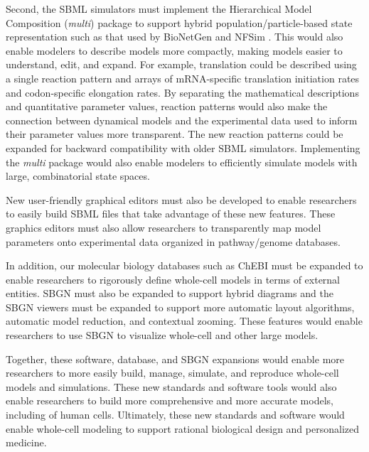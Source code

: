 \documentclass[journal,transmag]{IEEEtran}
\begin{document}
Second, the SBML simulators must implement the Hierarchical Model Composition (\emph{multi}) package to support hybrid population/particle-based state representation such as that used by BioNetGen \cite{Hlavacek2006, Hogg2014} and NFSim \cite{Sneddon2011}. This would also enable modelers to describe models more compactly, making models easier to understand, edit, and expand. For example, translation could be described using a single reaction pattern and arrays of mRNA-specific translation initiation rates and codon-specific elongation rates. By separating the mathematical descriptions and quantitative parameter values, reaction patterns would also make the connection between dynamical models and the experimental data used to inform their parameter values more transparent. The new reaction patterns could be expanded for backward compatibility with older SBML simulators. Implementing the \emph{multi} package would also enable modelers to efficiently simulate models with large, combinatorial state spaces.

New user-friendly graphical editors must also be developed to enable researchers to easily build SBML files that take advantage of these new features. These graphics editors must also allow researchers to transparently map model parameters onto experimental data organized in pathway/genome databases.

In addition, our molecular biology databases such as ChEBI must be expanded to enable researchers to rigorously define whole-cell models in terms of external entities. SBGN must also be expanded to support hybrid diagrams and the SBGN viewers must be expanded to support more automatic layout algorithms, automatic model reduction, and contextual zooming. These features would enable researchers to use SBGN to visualize whole-cell and other large models.

Together, these software, database, and SBGN expansions would enable more researchers to more easily build, manage, simulate, and reproduce whole-cell models and simulations. These new standards and software tools would also enable researchers to build more comprehensive and more accurate models, including of human cells. Ultimately, these new standards and software would enable whole-cell modeling to support rational biological design and personalized medicine.
\end{document}

